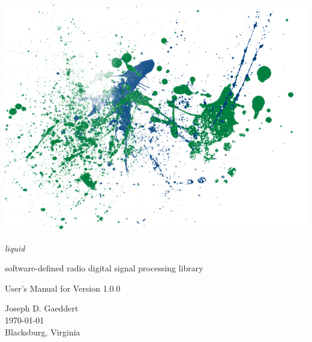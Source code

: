 \documentclass[11pt,twoside]{article}
\begin{document}



%
%
\thispagestyle{empty}
\begin{center}
\includegraphics[width=\textwidth]{graphics/liquid_splatter_00.png}
\end{center}

\vfill

\noindent
{\huge\it liquid}

\noindent
software-defined radio digital signal processing library

\vfill

\noindent
User's Manual for Version 1.0.0

\vfill

\noindent
Joseph D. Gaeddert \\
\today \\
Blacksburg, Virginia


\pagebreak
%
%
\tableofcontents
\pagebreak


\end{document}
